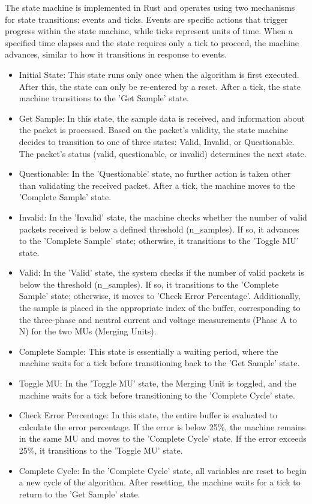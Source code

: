 The state machine is implemented in Rust and operates using two mechanisms for state transitions: events and ticks. Events are specific actions that trigger progress within the state machine, while ticks represent units of time. When a specified time elapses and the state requires only a tick to proceed, the machine advances, similar to how it transitions in response to events.
\begin{itemize}
	\item Initial State: This state runs only once when the algorithm is first executed. After this, the state can only be re-entered by a reset. After a tick, the state machine transitions to the 'Get Sample' state.
	\item Get Sample: In this state, the sample data is received, and information about the packet is processed. Based on the packet’s validity, the state machine decides to transition to one of three states: Valid, Invalid, or Questionable. The packet's status (valid, questionable, or invalid) determines the next state.
	\item Questionable: In the 'Questionable' state, no further action is taken other than validating the received packet. After a tick, the machine moves to the 'Complete Sample' state.
	\item Invalid: In the 'Invalid' state, the machine checks whether the number of valid packets received is below a defined threshold (n\_samples). If so, it advances to the 'Complete Sample' state; otherwise, it transitions to the 'Toggle MU' state.
	\item Valid: In the 'Valid' state, the system checks if the number of valid packets is below the threshold (n\_samples). If so, it transitions to the 'Complete Sample' state; otherwise, it moves to 'Check Error Percentage'. Additionally, the sample is placed in the appropriate index of the buffer, corresponding to the three-phase and neutral current and voltage measurements (Phase A to N) for the two MUs (Merging Units).
	\item Complete Sample: This state is essentially a waiting period, where the machine waits for a tick before transitioning back to the 'Get Sample' state.
	\item Toggle MU: In the 'Toggle MU' state, the Merging Unit is toggled, and the machine waits for a tick before transitioning to the 'Complete Cycle' state.
	\item Check Error Percentage: In this state, the entire buffer is evaluated to calculate the error percentage. If the error is below 25\%, the machine remains in the same MU and moves to the 'Complete Cycle' state. If the error exceeds 25\%, it transitions to the 'Toggle MU' state.
	\item Complete Cycle: In the 'Complete Cycle' state, all variables are reset to begin a new cycle of the algorithm. After resetting, the machine waits for a tick to return to the 'Get Sample' state.
\end{itemize}

